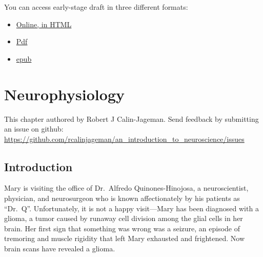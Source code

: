 \documentclass[
]{book}
\begin{document}
You can access early-stage draft in three different formats:

\begin{itemize}
\item
  \href{https://rcalinjageman.github.io/an_introduction_to_neuroscience/}{Online, in HTML}
\item
  \href{https://rcalinjageman.github.io/an_introduction_to_neuroscience/docs/Intro_to_Neuroscience.pdf}{Pdf}
\item
  \href{https://rcalinjageman.github.io/an_introduction_to_neuroscience/docs/Intro_to_Neuroscience.epub}{epub}
\end{itemize}

\hypertarget{neurophysiology}{%
\chapter{Neurophysiology}\label{neurophysiology}}

This chapter authored by Robert J Calin-Jageman. Send feedback by submitting an issue on github: \url{https://github.com/rcalinjageman/an_introduction_to_neuroscience/issues}

\hypertarget{neurophysiology-introduction}{%
\section{Introduction}\label{neurophysiology-introduction}}

Mary is visiting the office of Dr.~Alfredo Quinones-Hinojosa, a neuroscientist, physician, and neurosurgeon who is known affectionately by his patients as ``Dr.~Q''. Unfortunately, it is not a happy visit---Mary has been diagnosed with a glioma, a tumor caused by runaway cell division among the glial cells in her brain. Her first sign that something was wrong was a seizure, an episode of tremoring and muscle rigidity that left Mary exhausted and frightened. Now brain scans have revealed a glioma.
\end{document}
